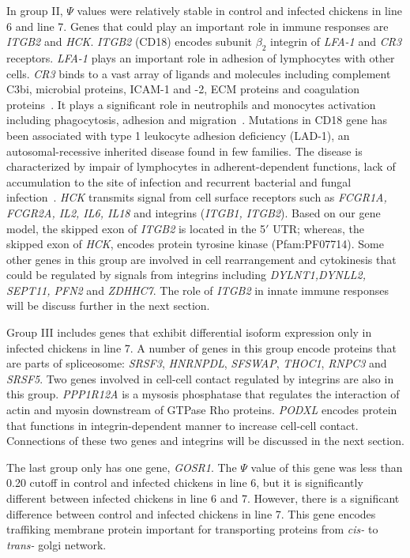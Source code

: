\documentclass[10pt]{article}
\begin{document}
In group II, $\Psi$ values were relatively stable in control and infected chickens in line 6 and line 7.
Genes that could play an important role in immune responses are \textit{ITGB2} and \textit{HCK}.
\textit{ITGB2} (CD18) encodes subunit $\beta_{2}$ integrin of \textit{LFA-1} and \textit{CR3} receptors.
\textit{LFA-1} plays an important role in adhesion of lymphocytes with other cells.
\textit{CR3} binds to a vast array of ligands and molecules including complement C3bi, microbial proteins,
ICAM-1 and -2, ECM proteins and coagulation proteins~\cite{}.
It plays a significant role in neutrophils and monocytes activation including phagocytosis, adhesion and
migration~\cite{}.
Mutations in CD18 gene has been associated with type 1 leukocyte adhesion deficiency (LAD-1),
an autosomal-recessive inherited disease found in few families.
The disease is characterized by impair of lymphocytes in adherent-dependent functions, lack of accumulation
to the site of infection and recurrent bacterial and fungal infection~\cite{}.
\textit{HCK} transmits signal from cell surface receptors such as \textit{FCGR1A, FCGR2A, IL2, IL6,
IL18} and integrins (\textit{ITGB1, ITGB2}).
Based on our gene model, the skipped exon of \textit{ITGB2} is located in the 5$\prime$ UTR;
whereas, the skipped exon of \textit{HCK}, encodes protein tyrosine kinase (Pfam:PF07714).
Some other genes in this group are involved in cell rearrangement and cytokinesis that could be
regulated by signals from integrins including \textit{DYLNT1,DYNLL2, SEPT11, PFN2} and \textit{ZDHHC7}.
The role of \textit{ITGB2} in innate immune responses will be discuss further in the next section.

Group III includes genes that exhibit differential isoform expression only in infected chickens in line 7.
A number of genes in this group encode proteins that are parts of spliceosome: \textit{SRSF3}, \textit{HNRNPDL},
\textit{SFSWAP}, \textit{THOC1}, \textit{RNPC3} and \textit{SRSF5}.
Two genes involved in cell-cell contact regulated by integrins are also in this group.
\textit{PPP1R12A} is a mysosis phosphatase that regulates the interaction of actin and myosin downstream of GTPase
Rho proteins.
\textit{PODXL} encodes protein that functions in integrin-dependent manner to increase cell-cell contact.
Connections of these two genes and integrins will be discussed in the next section.

The last group only has one gene, \textit{GOSR1}.
The $\Psi$ value of this gene was less than 0.20 cutoff in control and infected chickens in line 6, but it is
significantly different between infected chickens in line 6 and 7.
However, there is a significant difference between control and infected chickens in line 7.
This gene encodes traffiking membrane protein important for transporting proteins from \textit{cis-} to \textit{trans-}
golgi network.
\end{document}
